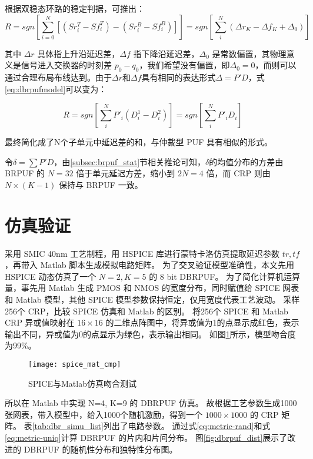 根据双稳态环路的稳定判据，可推出：
\begin{equation}\label{eq:dbrpufmodel}
R=sgn[\sum\limits_{i=0}^{N}[(Sr_i^T-Sf_i^T)-(Sr_i^B-Sf_i^B)]]=sgn[\sum\limits_{i}^{N}(\Delta r_K-\Delta f_K+\Delta_0)]
\end{equation}

其中 $ \Delta r $ 具体指上升沿延迟差，$ \Delta f $ 指下降沿延迟差，$ \Delta_0 $ 是常数偏置，其物理意义是信号进入交换器的时刻差 $ p_0-q_0 $，我们希望没有偏置，即$ \Delta_0=0 $，而则可以通过合理布局布线达到。由于$ \Delta r $和$ \Delta f $具有相同的表达形式$ \Delta=P'D $，式\ref{eq:dbrpufmodel}可以变为：

\begin{equation}
R=sgn[\sum\limits_{i}^{N}P'_i(D_i^1-D_i^2)]=sgn[\sum\limits_{i}^{N}P'_iD_i]
\end{equation}

最终简化成了N个子单元中延迟差的和，与仲裁型 PUF 具有相似的形式。

令$ \delta=\sum P'D $，由\ref{subsec:brpuf_stat}节相关推论可知，$ \delta $的均值分布的方差由 BRPUF 的 $ N=32 $ 倍于单元延迟方差，缩小到 $ 2N=4 $ 倍，而 CRP 则由 $ N\times (K-1) $ 保持与 BRPUF 一致。

\section{仿真验证}
采用 SMIC 40nm 工艺制程，用 HSPICE 库进行蒙特卡洛仿真提取延迟参数 $ tr, tf $，再带入 Matlab 脚本生成模拟电路矩阵。
为了交叉验证模型准确性，本文先用 HSPICE 动态仿真了一个 $ N=2, K=5 $ 的 8 bit DBRPUF。
为了简化计算机运算量，事先用 Matlab 生成 PMOS 和 NMOS 的宽度分布，同时赋值给 SPICE 网表和 Matlab 模型，其他 SPICE 模型参数保持恒定，仅用宽度代表工艺波动。
采样256个 CRP，比较 SPICE 仿真和 Matlab 的区别。
将256个 SPICE 和 Matlab CRP 异或值映射在 $ 16\times16 $ 的二维点阵图中，将异或值为1的点显示成红色，表示输出不同，异或值为0的点显示为绿色，表示输出相同。
如图\ref{fig:spice_mat_cmp}所示，模型吻合度为99\%。

\begin{figure}[htb]
\centering
\texttt{[image: spice\_mat\_cmp]}
\caption{SPICE与Matlab仿真吻合测试}
\label{fig:spice_mat_cmp}
\end{figure}

所以在 Matlab 中实现 N=4, K=9 的 DBRPUF 仿真。
故根据工艺参数生成1000张网表，带入模型中，给入1000个随机激励，得到一个 $ 1000\times 1000 $ 的 CRP 矩阵。
表\ref{tab:dbr_simu_list}列出了电路参数。
通过式\ref{eq:metric-rand}和式\ref{eq:metric-uniq}计算 DBRPUF 的片内和片间分布。
图\ref{fig:dbrpuf_dist}展示了改进的 DBRPUF 的随机性分布和独特性分布图。


